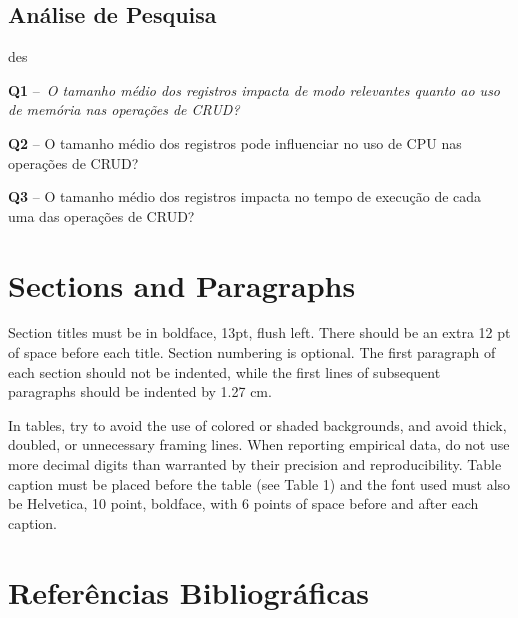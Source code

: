 \documentclass[12pt]{article}
\begin{document}
\subsection{Análise de Pesquisa}
des

\textbf{Q1} --~\emph{O tamanho médio dos registros impacta de modo relevantes quanto ao uso de memória nas operações de CRUD?}

\textbf{Q2} -- O tamanho médio dos registros pode influenciar no uso de CPU nas operações de CRUD? 

\textbf{Q3} -- O tamanho médio dos registros impacta no tempo de execução de cada uma das operações de CRUD?


\section{Sections and Paragraphs}

Section titles must be in boldface, 13pt, flush left. There should be an extra
12 pt of space before each title. Section numbering is optional. The first
paragraph of each section should not be indented, while the first lines of
subsequent paragraphs should be indented by 1.27 cm.


In tables, try to avoid the use of colored or shaded backgrounds, and avoid
thick, doubled, or unnecessary framing lines. When reporting empirical data,
do not use more decimal digits than warranted by their precision and
reproducibility. Table caption must be placed before the table (see Table 1)
and the font used must also be Helvetica, 10 point, boldface, with 6 points of
space before and after each caption.



\section{Referências Bibliográficas}



\end{document}

